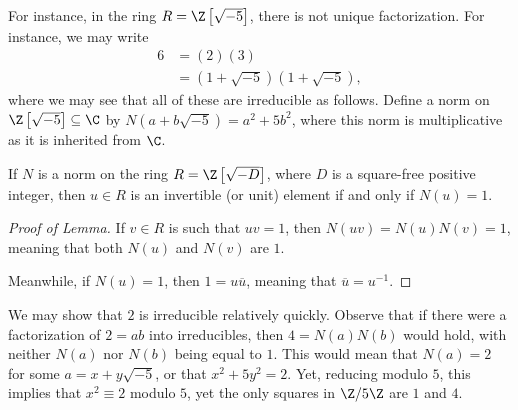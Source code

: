 \documentclass[10pt]{mypackage}
\begin{document}
\begin{example}
For instance, in the ring $R = \Z\left[ \sqrt{-5} \right]$, there is not unique factorization. For instance, we may write
\begin{align*}
  6 &= \left( 2 \right)\left( 3 \right)\\
    &= \left( 1 + \sqrt{-5} \right)\left( 1 + \sqrt{-5} \right),
\end{align*}
where we may see that all of these are irreducible as follows. Define a norm on $\Z\left[ \sqrt{-5} \right]\subseteq \C$ by $N\left( a + b\sqrt{-5} \right) = a^2 + 5b^2$, where this norm is multiplicative as it is inherited from $\C$.
\begin{lemma}
  If $N$ is a norm on the ring $R = \Z\left[ \sqrt{-D} \right]$, where $D$ is a square-free positive integer, then $u\in R$ is an invertible (or unit) element if and only if $N(u) = 1$.
\end{lemma}
\begin{proof}[Proof of Lemma]
  If $v\in R$ is such that $uv = 1$, then $N(uv) = N(u)N(v) = 1$, meaning that both $N(u)$ and $N(v)$ are $1$.%

  Meanwhile, if $N(u) = 1$, then $1 = u \overline{u}$, meaning that $ \overline{u} = u^{-1} $.
\end{proof}
We may show that $2$ is irreducible relatively quickly. Observe that if there were a factorization of $2 = ab$ into irreducibles, then $4 = N(a)N(b)$ would hold, with neither $N(a)$ nor $N(b)$ being equal to $1$. This would mean that $N(a) = 2$ for some $a = x + y\sqrt{-5}$, or that $x^2 + 5y^2 = 2$. Yet, reducing modulo $5$, this implies that $x^2 \equiv 2$ modulo $5$, yet the only squares in $\Z/5\Z$ are $1$ and $4$.
\end{example}
\end{document}

